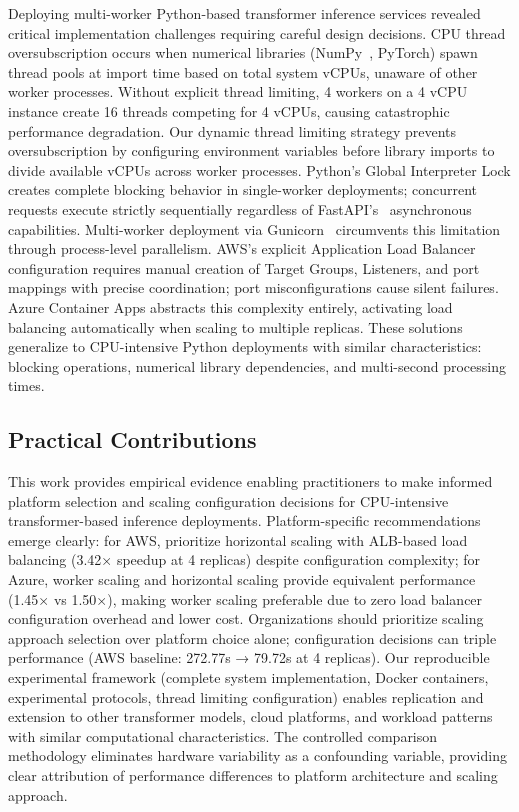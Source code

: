 Deploying multi-worker Python-based transformer inference services revealed critical implementation challenges requiring careful design decisions. CPU thread oversubscription occurs when numerical libraries (NumPy~\cite{numpy2024}, PyTorch) spawn thread pools at import time based on total system vCPUs, unaware of other worker processes. Without explicit thread limiting, 4 workers on a 4 vCPU instance create 16 threads competing for 4 vCPUs, causing catastrophic performance degradation. Our dynamic thread limiting strategy prevents oversubscription by configuring environment variables before library imports to divide available vCPUs across worker processes. Python's Global Interpreter Lock creates complete blocking behavior in single-worker deployments; concurrent requests execute strictly sequentially regardless of FastAPI's~\cite{fastapi2024} asynchronous capabilities. Multi-worker deployment via Gunicorn~\cite{gunicorn2023docs} circumvents this limitation through process-level parallelism. AWS's explicit Application Load Balancer configuration requires manual creation of Target Groups, Listeners, and port mappings with precise coordination; port misconfigurations cause silent failures. Azure Container Apps abstracts this complexity entirely, activating load balancing automatically when scaling to multiple replicas. These solutions generalize to CPU-intensive Python deployments with similar characteristics: blocking operations, numerical library dependencies, and multi-second processing times.

\subsection{Practical Contributions}

This work provides empirical evidence enabling practitioners to make informed platform selection and scaling configuration decisions for CPU-intensive transformer-based inference deployments. Platform-specific recommendations emerge clearly: for AWS, prioritize horizontal scaling with ALB-based load balancing (3.42× speedup at 4 replicas) despite configuration complexity; for Azure, worker scaling and horizontal scaling provide equivalent performance (1.45× vs 1.50×), making worker scaling preferable due to zero load balancer configuration overhead and lower cost. Organizations should prioritize scaling approach selection over platform choice alone; configuration decisions can triple performance (AWS baseline: 272.77s → 79.72s at 4 replicas). Our reproducible experimental framework (complete system implementation, Docker containers, experimental protocols, thread limiting configuration) enables replication and extension to other transformer models, cloud platforms, and workload patterns with similar computational characteristics. The controlled comparison methodology eliminates hardware variability as a confounding variable, providing clear attribution of performance differences to platform architecture and scaling approach.

